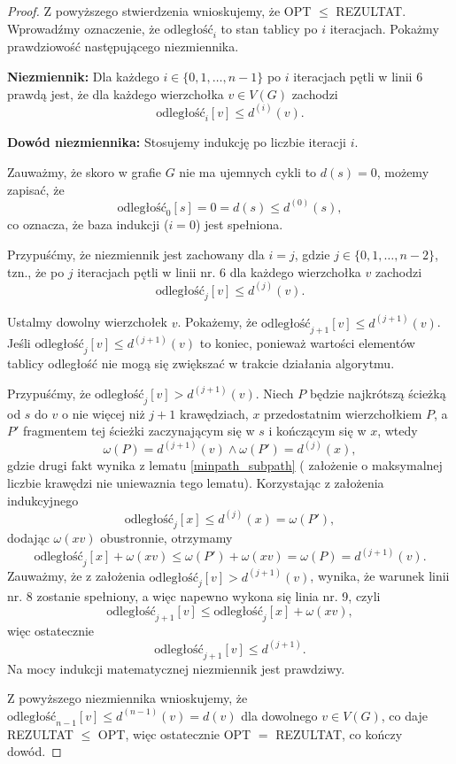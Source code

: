 \begin{theorem}
\begin{proof}
		Z powyższego stwierdzenia wnioskujemy, że
		OPT $\leq$ REZULTAT. Wprowadźmy oznaczenie, że $\text{odległość}_i$ to 
		stan tablicy po $i$ iteracjach.
		Pokażmy prawdziowość następującego 
		niezmiennika. 
		
		\textbf{Niezmiennik:} Dla każdego 
		$i \in \{0,1, \dots, n-1\}$ po $i$ iteracjach
		pętli w linii 6 prawdą jest, że dla każdego 
		wierzchołka $v \in V(G)$ zachodzi
		\[\text{odległość}_i[v] \leq d^{(i)}(v).\]
		
		\textbf{Dowód niezmiennika:} Stosujemy indukcję
		po liczbie iteracji $i$. 
		
		Zauważmy, że skoro w grafie $G$ nie ma ujemnych 
		cykli to $d(s) = 0$, możemy zapisać, że
		\[\text{odległość}_0[s] = 0 = d(s) \leq d^{(0)}(s),\]
		co oznacza, że baza indukcji ($i=0$) jest spełniona.
		
		Przypuśćmy, że niezmiennik jest zachowany dla $i=j$,
		gdzie $j\in \{0, 1, \dots, n-2\}$, tzn., że po $j$
		iteracjach pętli w linii nr. 6 dla każdego wierzchołka
		$v$ zachodzi
		\[\text{odległość}_j[v] \leq d^{(j)}(v).\]
		
		Ustalmy dowolny wierzchołek $v$. Pokażemy, że
		$\text{odległość}_{j+1}[v] \leq d^{(j+1)}(v)$. Jeśli
		$\text{odległość}_j[v] \leq d^{(j+1)}(v)$ to koniec, 
		ponieważ wartości elementów tablicy odległość
		nie mogą się zwiększać w trakcie działania algorytmu.
		
		Przypuśćmy, że $\text{odległość}_j[v] > d^{(j+1)}(v)$.
		Niech $P$ będzie najkrótszą ścieżką od $s$ do $v$
		o nie więcej niż $j+1$ krawędziach, $x$ przedostatnim 
		wierzchołkiem $P$, a $P'$ fragmentem tej ścieżki
		zaczynającym się w $s$ i kończącym się w $x$, wtedy
		\[\omega(P) = d^{(j+1)}(v) \land \omega(P') = d^{(j)}(x),\]
		gdzie drugi fakt wynika z lematu \ref{minpath_subpath} (
		założenie o maksymalnej liczbie krawędzi nie uniewaznia
		tego lematu).
		Korzystając z założenia indukcyjnego
		\[\text{odległość}_j[x] \leq d^{(j)}(x)=\omega(P'),\]
		dodając $\omega(xv)$ obustronnie, otrzymamy
		\[\text{odległość}_j[x] + \omega(xv) \leq \omega(P') 
		+ \omega(xv) = \omega(P) = d^{(j+1)}(v).\]
		Zauważmy, że z założenia $\text{odległość}_j[v] > d^{(j+1)}(v)$,
		wynika, że warunek linii nr. 8 zostanie spełniony,
		a więc napewno wykona się linia nr. 9, czyli
		\[\text{odległość}_{j+1}[v]\leq 
		\text{odległość}_j[x] + \omega(xv),\]
		więc ostatecznie
		\[\text{odległość}_{j+1}[v]\leq d^{(j+1)}.\]
		Na mocy indukcji matematycznej niezmiennik jest prawdziwy.
		
		Z powyższego niezmiennika wnioskujemy, że 
		$\text{odległość}_{n-1}[v] \leq d^{(n-1)}(v) = d(v)$ dla dowolnego 
		$v \in V(G)$, co daje
		REZULTAT $\leq$ OPT,
		więc ostatecznie OPT $=$ REZULTAT, co kończy dowód.
		
	\end{proof}
	\label{bellmanford_proof}
\end{theorem}

